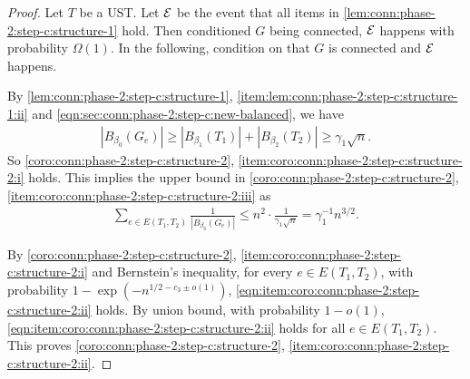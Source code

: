 \begin{proof}
  Let $T$ be a UST. Let $\mathcal{E}$ be the event that all items in \cref{lem:conn:phase-2:step-c:structure-1} hold.
  Then conditioned $G$ being connected, $\mathcal{E}$ happens with probability $\Omega(1)$.
  In the following, condition on that $G$ is connected and $\mathcal{E}$ happens.

  By \cref{lem:conn:phase-2:step-c:structure-1}, \cref{item:lem:conn:phase-2:step-c:structure-1:ii} and \cref{eqn:sec:conn:phase-2:step-c:new-balanced}, we have
  \begin{align*}
    \left| B_{\beta_0}(G_e) \right| \ge \left| B_{\beta_1}(T_1) \right| + \left| B_{\beta_2}(T_2) \right| \ge \gamma_1 \sqrt n.
  \end{align*}
  So \cref{coro:conn:phase-2:step-c:structure-2}, \cref{item:coro:conn:phase-2:step-c:structure-2:i} holds.
  This implies the upper bound in \cref{coro:conn:phase-2:step-c:structure-2}, \cref{item:coro:conn:phase-2:step-c:structure-2:iii} as
  \begin{align*}
    \sum_{e\in E(T_1,T_2)} \frac 1{\left| B_{\beta_0}(G_e) \right|} \le n^2 \cdot \frac 1{\gamma_1 \sqrt n} = \gamma_1^{-1} n^{3/2}.
  \end{align*}

  By \cref{coro:conn:phase-2:step-c:structure-2}, \cref{item:coro:conn:phase-2:step-c:structure-2:i} and Bernstein's inequality, for every $e\in E(T_1,T_2)$, with probability $1-\exp\left(-n^{1/2-c_3\pm o(1)}\right)$, \cref{eqn:item:coro:conn:phase-2:step-c:structure-2:ii} holds.
  By union bound, with probability $1-o(1)$, \cref{eqn:item:coro:conn:phase-2:step-c:structure-2:ii} holds for all $e\in E(T_1,T_2)$.
  This proves \cref{coro:conn:phase-2:step-c:structure-2}, \cref{item:coro:conn:phase-2:step-c:structure-2:ii}.


\end{proof}
